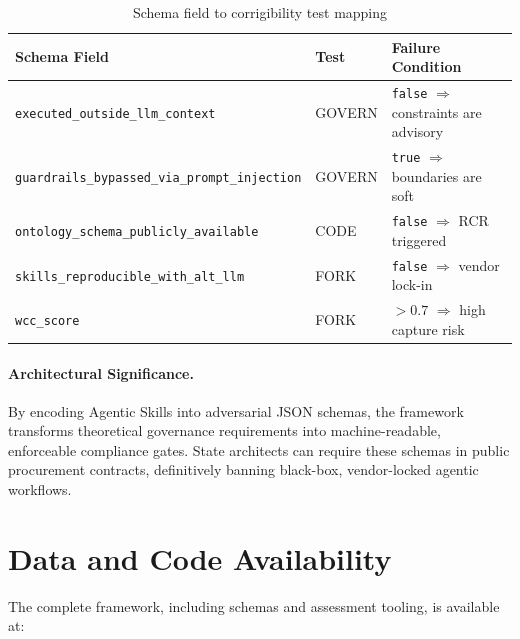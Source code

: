 \documentclass[11pt,a4paper]{article}
\theoremstyle{definition}
\begin{document}
\begin{table}[htbp]
\centering
\caption{Schema field to corrigibility test mapping}
\label{tab:schema-mapping}
\small
\begin{tabular}{@{}llp{5cm}@{}}
\toprule
\textbf{Schema Field} & \textbf{Test} & \textbf{Failure Condition} \\
\midrule
\texttt{executed\_outside\_llm\_context} & GOVERN & \texttt{false} $\Rightarrow$ constraints are advisory \\
\texttt{guardrails\_bypassed\_via\_prompt\_injection} & GOVERN & \texttt{true} $\Rightarrow$ boundaries are soft \\
\texttt{ontology\_schema\_publicly\_available} & CODE & \texttt{false} $\Rightarrow$ RCR triggered \\
\texttt{skills\_reproducible\_with\_alt\_llm} & FORK & \texttt{false} $\Rightarrow$ vendor lock-in \\
\texttt{wcc\_score} & FORK & $> 0.7$ $\Rightarrow$ high capture risk \\
\bottomrule
\end{tabular}
\end{table}

\paragraph{Architectural Significance.} By encoding Agentic Skills into adversarial JSON schemas, the framework transforms theoretical governance requirements into machine-readable, enforceable compliance gates. State architects can require these schemas in public procurement contracts, definitively banning black-box, vendor-locked agentic workflows.

\section*{Data and Code Availability}

The complete framework, including schemas and assessment tooling, is available at:
\end{document}
